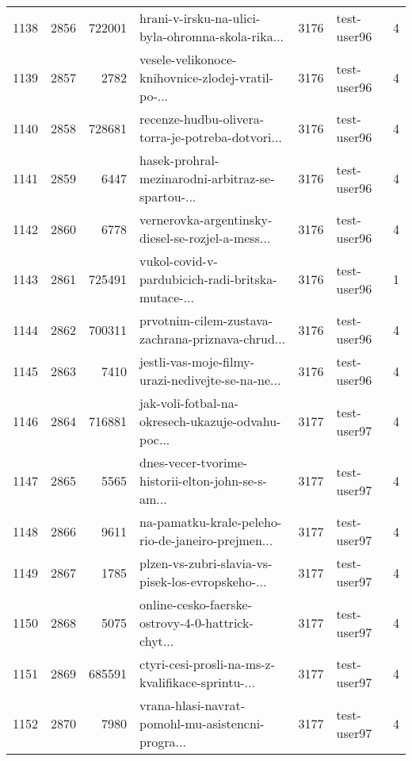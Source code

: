 \begin{tabular}{lrrlrlr}
1138 &       2856 &   722001 &  hrani-v-irsku-na-ulici-byla-ohromna-skola-rika... &     3176 &                  test-user96 &               4 \\
1139 &       2857 &     2782 &  vesele-velikonoce-knihovnice-zlodej-vratil-po-... &     3176 &                  test-user96 &               4 \\
1140 &       2858 &   728681 &  recenze-hudbu-olivera-torra-je-potreba-dotvori... &     3176 &                  test-user96 &               4 \\
1141 &       2859 &     6447 &  hasek-prohral-mezinarodni-arbitraz-se-spartou-... &     3176 &                  test-user96 &               4 \\
1142 &       2860 &     6778 &  vernerovka-argentinsky-diesel-se-rozjel-a-mess... &     3176 &                  test-user96 &               4 \\
1143 &       2861 &   725491 &  vukol-covid-v-pardubicich-radi-britska-mutace-... &     3176 &                  test-user96 &               1 \\
1144 &       2862 &   700311 &  prvotnim-cilem-zustava-zachrana-priznava-chrud... &     3176 &                  test-user96 &               4 \\
1145 &       2863 &     7410 &  jestli-vas-moje-filmy-urazi-nedivejte-se-na-ne... &     3176 &                  test-user96 &               4 \\
1146 &       2864 &   716881 &  jak-voli-fotbal-na-okresech-ukazuje-odvahu-poc... &     3177 &                  test-user97 &               4 \\
1147 &       2865 &     5565 &  dnes-vecer-tvorime-historii-elton-john-se-s-am... &     3177 &                  test-user97 &               4 \\
1148 &       2866 &     9611 &  na-pamatku-krale-peleho-rio-de-janeiro-prejmen... &     3177 &                  test-user97 &               4 \\
1149 &       2867 &     1785 &  plzen-vs-zubri-slavia-vs-pisek-los-evropskeho-... &     3177 &                  test-user97 &               4 \\
1150 &       2868 &     5075 &  online-cesko-faerske-ostrovy-4-0-hattrick-chyt... &     3177 &                  test-user97 &               4 \\
1151 &       2869 &   685591 &  ctyri-cesi-prosli-na-ms-z-kvalifikace-sprintu-... &     3177 &                  test-user97 &               4 \\
1152 &       2870 &     7980 &  vrana-hlasi-navrat-pomohl-mu-asistencni-progra... &     3177 &                  test-user97 &               4 \\

\end{tabular}
